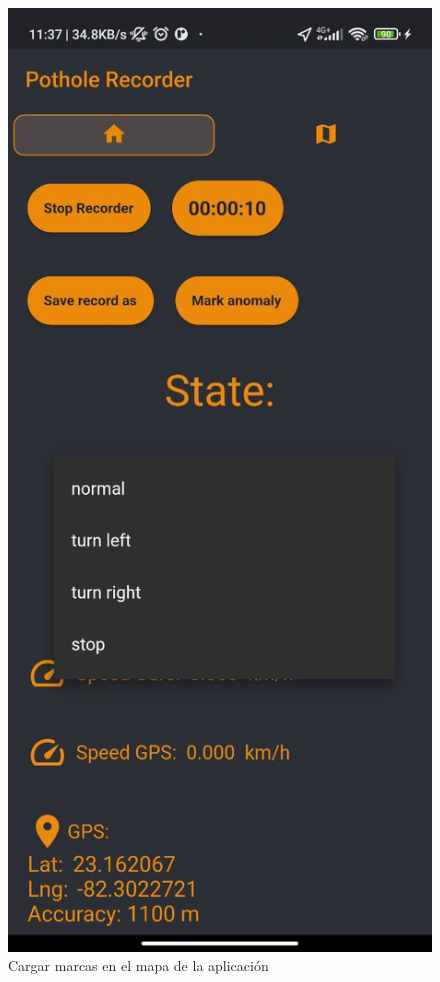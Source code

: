 \begin{figure}[htb]
		\includegraphics[scale = 0.2]{Graphics/apk_change_state_2.jpg}
		\caption{Cargar marcas en el mapa de la aplicación}
		\label{fig:9}
	\end{figure}

